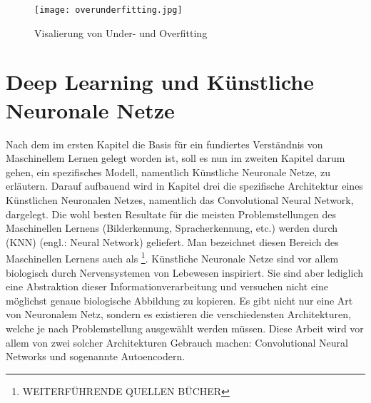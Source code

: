 \begin{figure}[h!]
  \centering
  \texttt{[image: overunderfitting.jpg]}
  \caption{Visalierung von Under- und Overfitting}
\end{figure}

\cite{wiki:overfitting}


\chapter{Deep Learning und Künstliche Neuronale Netze}
Nach dem im ersten Kapitel die Basis für ein fundiertes Verständnis von
Maschinellem Lernen gelegt worden ist, soll es nun im zweiten Kapitel darum
gehen, ein spezifisches Modell, namentlich Künstliche Neuronale Netze, zu
erläutern. Darauf aufbauend wird in Kapitel drei die spezifische Architektur
eines Künstlichen Neuronalen Netzes, namentlich das Convolutional Neural Network,
dargelegt.
\para{}
Die wohl besten Resultate für die meisten Problemstellungen des Maschinellen Lernens (Bilderkennung,
Spracherkennung, etc.) werden durch  (KNN) (engl.: Neural Network) geliefert.
Man bezeichnet diesen Bereich des Maschinellen Lernens auch als \footnote{WEITERFÜHRENDE QUELLEN BÜCHER}.
\para{}
Künstliche Neuronale Netze sind vor allem biologisch durch Nervensystemen von
Lebewesen inspiriert.
Sie sind aber lediglich eine Abstraktion dieser Informationverarbeitung und
versuchen nicht eine möglichst genaue biologische Abbildung zu kopieren.
Es gibt nicht nur eine Art von Neuronalem Netz, sondern es existieren die
verschiedensten Architekturen, welche je nach Problemstellung ausgewählt werden
müssen. Diese Arbeit wird vor allem von zwei solcher Architekturen Gebrauch machen:
Convolutional Neural Networks und sogenannte Autoencodern.

\para{}
\cite{wiki:kuenstliches_neuronales_netz}

